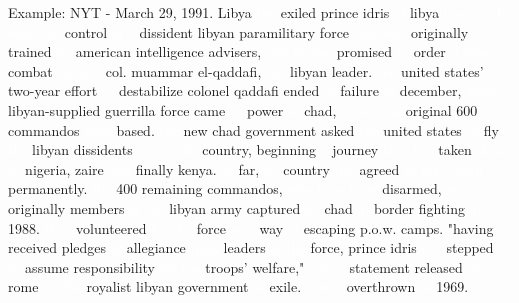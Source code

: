 \documentclass[english]{beamer}
\begin{document}
\begin{frame}
{\normalsize{Example: NYT - March 29, 1991. Libya}}
\textcolor{white}{the} exiled prince idris \textcolor{white}{of} libya %
\textcolor{white}{has} \textcolor{white}{said} \textcolor{white}{he} %
\textcolor{white}{will} \textcolor{white}{take} control \textcolor{white}{of}
\textcolor{white}{a} dissident libyan paramilitary force %
\textcolor{white}{that} \textcolor{white}{was} originally trained %
\textcolor{white}{by} american intelligence advisers, \textcolor{white}{and} %
\textcolor{white}{he} \textcolor{white}{has} promised \textcolor{white}{to}
order \textcolor{white}{it} \textcolor{white}{into} combat %
\textcolor{white}{against} col. muammar el-qaddafi, \textcolor{white}{the}
libyan leader. \textcolor{white}{the} united states' two-year effort %
\textcolor{white}{to} destabilize colonel qaddafi ended \textcolor{white}{in}
failure \textcolor{white}{in} december, \textcolor{white}{when} %
\textcolor{white}{a} libyan-supplied guerrilla force came %
\textcolor{white}{to} power \textcolor{white}{in} chad, %
\textcolor{white}{where} \textcolor{white}{the} original 600 commandos %
\textcolor{white}{were} based. \textcolor{white}{the} new chad government
asked \textcolor{white}{the} united states \textcolor{white}{to} fly %
\textcolor{white}{the} libyan dissidents \textcolor{white}{out} %
\textcolor{white}{of} \textcolor{white}{the} country, beginning %
\textcolor{white}{a} journey \textcolor{white}{that} \textcolor{white}{has}
taken \textcolor{white}{them} \textcolor{white}{to} nigeria, zaire %
\textcolor{white}{and} finally kenya. \textcolor{white}{so} far, %
\textcolor{white}{no} country \textcolor{white}{has} agreed %
\textcolor{white}{to} \textcolor{white}{take} \textcolor{white}{them}
permanently. \textcolor{white}{the} 400 remaining commandos, %
\textcolor{white}{who} \textcolor{white}{have} \textcolor{white}{been}
disarmed, \textcolor{white}{were} originally members \textcolor{white}{of} %
\textcolor{white}{the} libyan army captured \textcolor{white}{by} chad %
\textcolor{white}{in} border fighting \textcolor{white}{in} 1988. %
\textcolor{white}{they} volunteered \textcolor{white}{for} %
\textcolor{white}{the} force \textcolor{white}{as} \textcolor{white}{a} way %
\textcolor{white}{of} escaping p.o.w. camps. "having received pledges %
\textcolor{white}{of} allegiance \textcolor{white}{from} leaders %
\textcolor{white}{of} \textcolor{white}{the} force, prince idris %
\textcolor{white}{has} stepped \textcolor{white}{in} \textcolor{white}{to}
assume responsibility \textcolor{white}{for} \textcolor{white}{the} troops'
welfare," \textcolor{white}{said} \textcolor{white}{a} statement released %
\textcolor{white}{in} rome \textcolor{white}{by} \textcolor{white}{the}
royalist libyan government \textcolor{white}{in} exile. \textcolor{white}{it}
\textcolor{white}{was} overthrown \textcolor{white}{in} 1969.
\end{frame}
\end{document}
